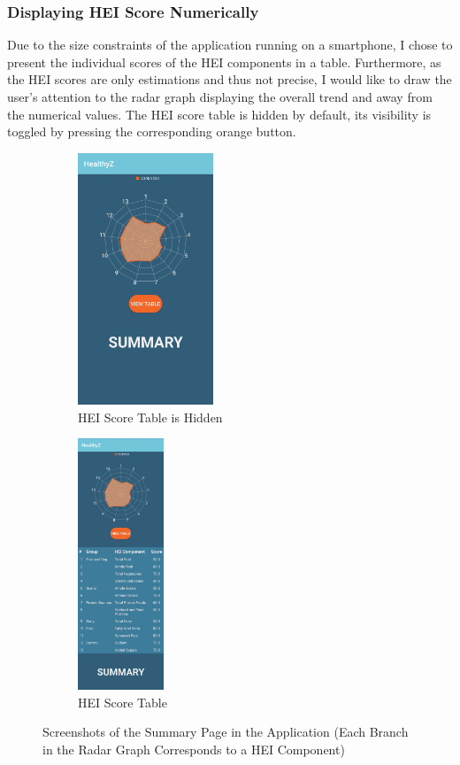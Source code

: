 \documentclass{article}
\begin{document}
\subsubsection{Displaying HEI Score Numerically}
Due to the size constraints of the application running on a smartphone, I chose to present the individual scores of the HEI components in a table. Furthermore, as the HEI scores are only estimations and thus not precise, I would like to draw the user's attention to the radar graph displaying the overall trend and away from the numerical values. The HEI score table is hidden by default, its visibility is toggled by pressing the corresponding orange button. 

\begin{figure}[h]
\centering
\hspace*{0.75cm} 
\begin{subfigure}{.4\textwidth}
  \centering
  \includegraphics[width = 4.05cm]{hei_table_invisible.jpg}
  \caption{HEI Score Table is Hidden}
  \label{fig:hei_table_invisible}
\end{subfigure}%
\begin{subfigure}{.4\textwidth}
  \centering
  \includegraphics[height = 7.515cm]{hei_table_visible.jpg}
  \caption{HEI Score Table}
  \label{fig:hei_table_visible}
\end{subfigure}
\caption{Screenshots of the Summary Page in the Application \newline (Each Branch in the Radar Graph Corresponds to a HEI Component)}
\label{fig:numerical_hei_scores}
\end{figure}
\end{document}

